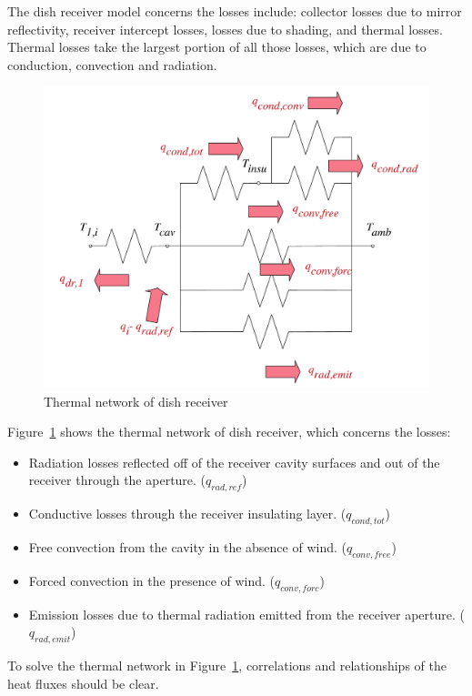 The dish receiver model concerns the losses include: collector losses due to mirror reflectivity, receiver intercept losses, losses due to shading, and thermal losses. Thermal losses take the largest portion of all those losses, which are due to conduction, convection and radiation.
\noindent \begin{figure}[htbp]
\begin{center}
	\includegraphics[width = 0.7\columnwidth]{fig/thermalLosses.pdf}
	\caption{Thermal network of dish receiver}
	\label{fig:thermal-lose}
\end{center}
\end{figure}
Figure~\ref{fig:thermal-lose} shows the thermal network of dish receiver, which concerns the losses:
\begin{itemize}
	\item Radiation losses reflected off of the receiver cavity surfaces and out of the receiver through the aperture. ($q_{rad,ref}$)
	\item Conductive losses through the receiver insulating layer. ($q_{cond,tot}$)
	\item Free convection from the cavity in the absence of wind. ($q_{conv,free}$)
	\item Forced convection in the presence of wind. ($q_{conv,forc}$)
	\item Emission losses due to thermal radiation emitted from the receiver aperture. ($q_{rad,emit}$)
\end{itemize}

To solve the thermal network in Figure~\ref{fig:thermal-lose}, correlations and relationships of the heat fluxes should be clear.

